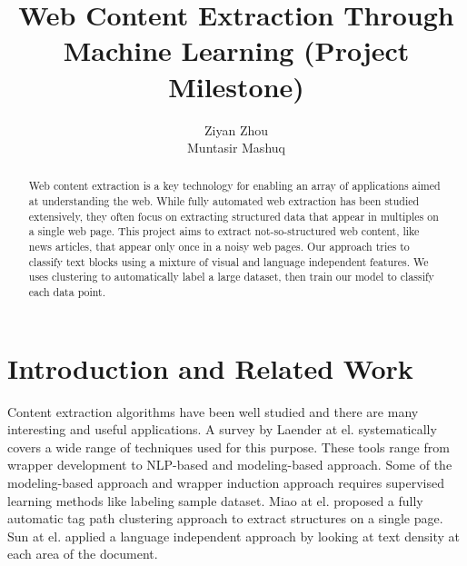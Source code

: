 \documentclass{acm_proc_article-sp}
\begin{document}
\title{Web Content Extraction Through Machine Learning (Project Milestone)
}

\author{
\alignauthor
Ziyan Zhou\\
\alignauthor
Muntasir Mashuq\\
}

\maketitle

\begin{abstract}
Web content extraction is a key technology for enabling an array of applications aimed at understanding the web. While fully automated web extraction has been studied extensively, they often focus on extracting structured data that appear in multiples on a single web page. This project aims to extract not-so-structured web content, like news articles, that appear only once in a noisy web pages. Our approach tries to classify text blocks using a mixture of visual and language independent features. We uses clustering to automatically label a large dataset, then train our model to classify each data point.
\end{abstract}


\section{Introduction and Related Work}

Content extraction algorithms have been well studied and there are many interesting and useful applications\cite{diffbot}\cite{readability}. A survey by Laender at el.\cite{laender:brief} systematically covers a wide range of techniques used for this purpose. These tools range from wrapper development to NLP-based and modeling-based approach. Some of the modeling-based approach and wrapper induction approach requires supervised learning methods like labeling sample dataset. Miao at el.\cite{gengxin:extracting} proposed a fully automatic tag path clustering approach to extract structures on a single page. Sun at el.\cite{sun2011dom} applied a language independent approach by looking at text density at each area of the document.
\end{document}
